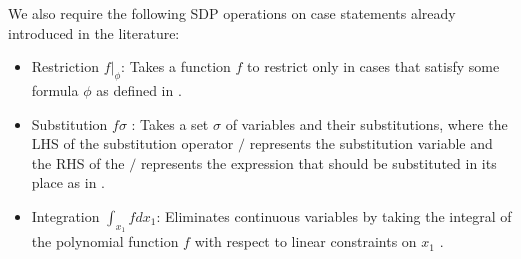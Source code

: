 \documentclass{article} %
\begin{document}
We also require the following SDP operations on case statements already introduced in the literature: 
\begin{itemize}
\item Restriction $f|_{\phi}$:  Takes a function $f$ to restrict only in cases
that satisfy some formula $\phi$ as defined in \cite{sanner_uai11}.
\item Substitution $f\sigma$ : Takes a set $\sigma$ of variables and their substitutions, where the LHS of the substitution operator $/$ represents the substitution variable and the RHS of the $/$ represents the expression that should be substituted in its place as in \cite{sanner_uai11}.
\item Integration $\int_{x_1} f dx_1$:  Eliminates continuous variables by taking the integral of the polynomial function $f$ with respect to linear constraints on $x_1$  \cite{sanner_aaai12}.
\end{itemize}
\end{document}
